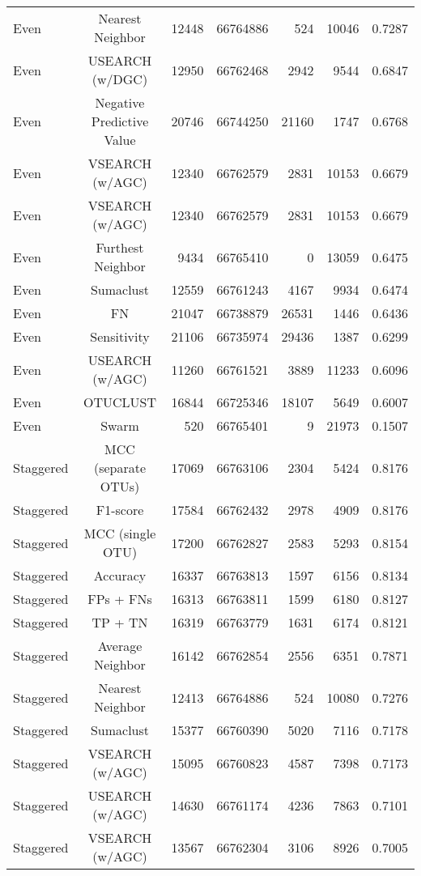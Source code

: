\documentclass[]{article}
\begin{document}
\begin{table}[!ht]
\begin{tabular}{lcrrrrc}
  Even & Nearest Neighbor & 12448 & 66764886 & 524 & 10046 & 0.7287 \\ 
  Even & USEARCH (w/DGC) & 12950 & 66762468 & 2942 & 9544 & 0.6847 \\ 
  Even & Negative Predictive Value & 20746 & 66744250 & 21160 & 1747 & 0.6768 \\ 
  Even & VSEARCH (w/AGC) & 12340 & 66762579 & 2831 & 10153 & 0.6679 \\ 
  Even & VSEARCH (w/AGC) & 12340 & 66762579 & 2831 & 10153 & 0.6679 \\ 
  Even & Furthest Neighbor & 9434 & 66765410 & 0 & 13059 & 0.6475 \\ 
  Even & Sumaclust & 12559 & 66761243 & 4167 & 9934 & 0.6474 \\ 
  Even & FN & 21047 & 66738879 & 26531 & 1446 & 0.6436 \\ 
  Even & Sensitivity & 21106 & 66735974 & 29436 & 1387 & 0.6299 \\ 
  Even & USEARCH (w/AGC) & 11260 & 66761521 & 3889 & 11233 & 0.6096 \\ 
  Even & OTUCLUST & 16844 & 66725346 & 18107 & 5649 & 0.6007 \\ 
  Even & Swarm & 520 & 66765401 & 9 & 21973 & 0.1507 \\ 
  Staggered & MCC (separate OTUs) & 17069 & 66763106 & 2304 & 5424 & 0.8176 \\ 
  Staggered & F1-score & 17584 & 66762432 & 2978 & 4909 & 0.8176 \\ 
  Staggered & MCC (single OTU) & 17200 & 66762827 & 2583 & 5293 & 0.8154 \\ 
  Staggered & Accuracy & 16337 & 66763813 & 1597 & 6156 & 0.8134 \\ 
  Staggered & FPs + FNs & 16313 & 66763811 & 1599 & 6180 & 0.8127 \\ 
  Staggered & TP + TN & 16319 & 66763779 & 1631 & 6174 & 0.8121 \\ 
  Staggered & Average Neighbor & 16142 & 66762854 & 2556 & 6351 & 0.7871 \\ 
  Staggered & Nearest Neighbor & 12413 & 66764886 & 524 & 10080 & 0.7276 \\ 
  Staggered & Sumaclust & 15377 & 66760390 & 5020 & 7116 & 0.7178 \\ 
  Staggered & VSEARCH (w/AGC) & 15095 & 66760823 & 4587 & 7398 & 0.7173 \\ 
  Staggered & USEARCH (w/AGC) & 14630 & 66761174 & 4236 & 7863 & 0.7101 \\ 
  Staggered & VSEARCH (w/AGC) & 13567 & 66762304 & 3106 & 8926 & 0.7005 \\ 

\end{tabular}
\end{table}
\end{document}

